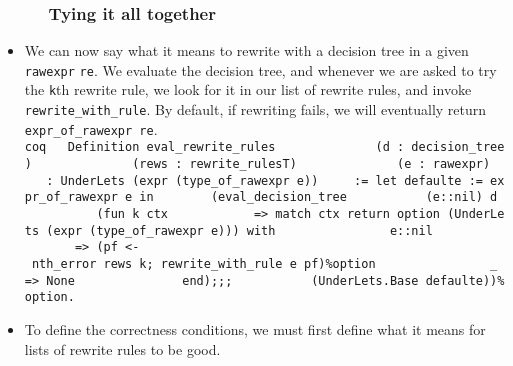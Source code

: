 \begin{itemize}
\begin{itemize}
    \subsubsection{Tying it all together}\label{tying-it-all-together}
  \end{itemize}
\item
  We can now say what it means to rewrite with a decision tree in a
  given \texttt{rawexpr} \texttt{re}. We evaluate the decision tree, and
  whenever we are asked to try the \texttt{k}th rewrite rule, we look
  for it in our list of rewrite rules, and invoke
  \texttt{rewrite\_with\_rule}. By default, if rewriting fails, we will
  eventually return \texttt{expr\_of\_rawexpr\ re}.
  \texttt{coq\ \ \ Definition\ eval\_rewrite\_rules\ \ \ ~\ ~\ ~\ ~\ ~\ ~(d\ :\ decision\_tree)\ \ \ ~\ ~\ ~\ ~\ ~\ ~(rews\ :\ rewrite\_rulesT)\ \ \ ~\ ~\ ~\ ~\ ~\ ~(e\ :\ rawexpr)\ \ \ ~\ :\ UnderLets\ (expr\ (type\_of\_rawexpr\ e))\ \ \ ~\ :=\ let\ defaulte\ :=\ expr\_of\_rawexpr\ e\ in\ \ \ ~\ ~\ ~(eval\_decision\_tree\ \ \ ~\ ~\ ~\ ~\ (e::nil)\ d\ \ \ ~\ ~\ ~\ ~\ (fun\ k\ ctx\ \ \ ~\ ~\ ~\ ~\ ~=\textgreater{}\ match\ ctx\ return\ option\ (UnderLets\ (expr\ (type\_of\_rawexpr\ e)))\ with\ \ \ ~\ ~\ ~\ ~\ ~\ ~\ \textbar{}\ e\textquotesingle{}::nil\ \ \ ~\ ~\ ~\ ~\ ~\ ~\ ~\ =\textgreater{}\ (pf\ \textless{}-\ nth\_error\ rews\ k;\ rewrite\_with\_rule\ e\textquotesingle{}\ pf)\%option\ \ \ ~\ ~\ ~\ ~\ ~\ ~\ \textbar{}\ \_\ =\textgreater{}\ None\ \ \ ~\ ~\ ~\ ~\ ~\ ~\ end);;;\ \ \ ~\ ~\ ~\ ~\ (UnderLets.Base\ defaulte))\%option.}
\item
  To define the correctness conditions, we must first define what it
  means for lists of rewrite rules to be good.


\end{itemize}
